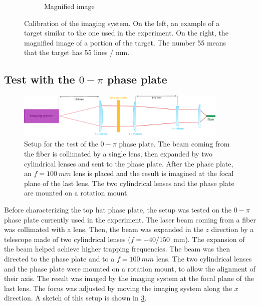 \begin{figure}
\begin{subfigure}[b]{0.55\textwidth}
        \caption{Magnified image}
        \label{fig:magnified}
    \end{subfigure}
    \hfill
    \caption{Calibration of the imaging system. On the left, an example of a target similar to the one used in the experiment. On the right, the magnified image of a portion of the target. The number 55 means that the target has 55 lines / \si{mm}.}
\end{figure}

\subsection{Test with the $0-\pi$ phase plate}
\begin{figure}
    \centering
    \includegraphics[width=0.9\textwidth]{chapters/chapter_3/figures/0pi_setup.pdf}
    \caption{Setup for the test of the $0-\pi$ phase plate. The beam coming from the fiber is collimated by a single lens, then expanded by two cylindrical lenses and sent to the phase plate. After the phase plate, an $f=\SI{100}{mm}$ lens is placed and the result is imagined at the focal plane of the last lens. The two cylindrical lenses and the phase plate are mounted on a rotation mount.}
    \label{fig:0pi_setup}
\end{figure}

Before characterizing the top hat phase plate, the setup was tested on the $0-\pi$ phase plate currently used in the experiment. The laser beam coming from a fiber was collimated with a lens. Then, the beam was expanded in the $z$ direction by a telescope made of two cylindrical lenses ($f=-40/150$~mm). The expansion of the beam helped achieve higher trapping frequencies. The beam was then directed to the phase plate and to a $f=\SI{100}{mm}$ lens. The two cylindrical lenses and the phase plate were mounted on a rotation mount, to allow the alignment of their axis. The result was imaged by the imaging system at the focal plane of the last lens. The focus was adjusted by moving the imaging system along the $x$ direction. A sketch of this setup is shown in \cref{fig:0pi_setup}.


